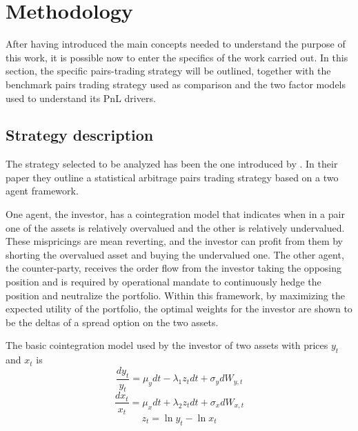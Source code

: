 \section{Methodology}
After having introduced the main concepts needed to understand the purpose of this work, it is possible now to enter the specifics of the work carried out. In this section, the specific pairs-trading strategy will be outlined, together with the benchmark pairs trading strategy used as comparison and the two factor models used to understand its PnL drivers.
\subsection{Strategy description}
The strategy selected to be analyzed has been the one introduced by \cite{ioannis_2023}. In their paper they outline a statistical arbitrage pairs trading strategy based on a two agent framework. 

One agent, the investor, has a cointegration model that indicates when in a pair one of the assets is relatively overvalued and the other is relatively undervalued. These mispricings are mean reverting, and the investor can profit from them by shorting the overvalued asset and buying the undervalued one. The other agent, the counter-party, receives the order flow from the investor taking the opposing position and is required by  operational mandate to continuously hedge the position and neutralize the portfolio. Within this framework, by maximizing the expected utility of the portfolio, the optimal weights for the investor are shown to be the deltas of a spread option on the two assets. 

The basic cointegration model used by the investor of two assets with prices $y_t$ and $x_t$ is 
\begin{equation}
    \frac{dy_t}{y_t}=\mu_ydt-\lambda_1z_tdt+\sigma_ydW_{y,t}
\end{equation}
\begin{equation}
    \frac{dx_t}{x_t}=\mu_xdt+\lambda_2z_tdt+\sigma_xdW_{x,t}
\end{equation}
\begin{equation}
    z_t=\ln y_t - \ln x_t
\end{equation}

